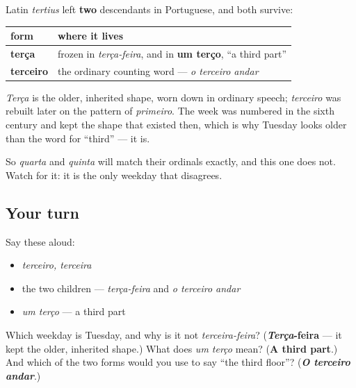 \begin{grammarlens}[title={Grammar Lens: two children of one word}]
Latin \emph{tertius} left \textbf{two} descendants in Portuguese, and both survive:

\noindent
\begin{tabularx}{\linewidth}{@{}>{\raggedright\arraybackslash}X>{\raggedright\arraybackslash}X@{}}
\toprule
\textbf{form} & \textbf{where it lives} \\
\midrule
\textbf{terça} & frozen in \emph{terça-feira}, and in \textbf{um terço}, \textquotedblleft{}a third part\textquotedblright{} \\
\textbf{terceiro} & the ordinary counting word — \emph{o terceiro andar} \\
\bottomrule
\end{tabularx}

\emph{Terça} is the older, inherited shape, worn down in ordinary speech; \emph{terceiro} was rebuilt later on the pattern of \emph{primeiro}. The week was numbered in the sixth century and kept the shape that existed then, which is why Tuesday looks older than the word for \textquotedblleft{}third\textquotedblright{} — it is.

So \emph{quarta} and \emph{quinta} will match their ordinals exactly, and this one does not. Watch for it: it is the only weekday that disagrees.
\end{grammarlens}

\subsection*{Your turn}
Say these aloud:

\begin{itemize}
\raggedright
  \item \emph{terceiro, terceira}
  \item the two children — \emph{terça-feira} and \emph{o terceiro andar}
  \item \emph{um terço} — a third part
\end{itemize}

\begin{tcolorbox}[breakable,colback=teal!4,colframe=teal!35!black,title={Before you move on}]
Which weekday is Tuesday, and why is it not \emph{terceira-feira}? (\textbf{\emph{Terça}-feira} — it kept the older, inherited shape.) What does \emph{um terço} mean? (\textbf{A third part}.) And which of the two forms would you use to say \textquotedblleft{}the third floor\textquotedblright{}? (\emph{\textbf{O terceiro andar}}.)
\end{tcolorbox}
